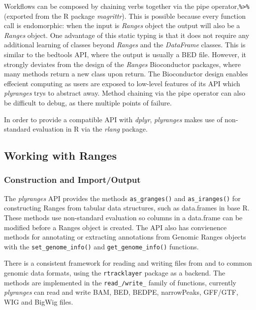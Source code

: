 \documentclass[10pt,letterpaper]{article}
\begin{document}
Workflows can be composed by chaining verbs together via the pipe
operator,\texttt{\%\textgreater{}\%} (exported from the R package
\emph{magrittr}). This is possible because every function call is
endomorphic: when the input is \emph{Ranges} object the output will also
be a \emph{Ranges} object. One advantage of this static typing is that
it does not require any additional learning of classes beyond
\emph{Ranges} and the \emph{DataFrame} classes. This is similar to the
bedtools API, where the output is usually a BED file. However, it
strongly deviates from the design of the \emph{Ranges} Bioconductor
packages, where many methods return a new class upon return. The
Bioconductor design enables effecient computing as users are exposed to
low-level features of its API which \emph{plyranges} trys to abstract
away. Method chaining via the pipe operator can also be difficult to
debug, as there multiple points of failure.

In order to provide a compatible API with \emph{dplyr}, \emph{plyranges}
makes use of non-standard evaluation in R via the \emph{rlang} package.

\hypertarget{working-with-ranges}{%
\subsection{Working with Ranges}\label{working-with-ranges}}

\hypertarget{construction-and-importoutput}{%
\subsubsection{Construction and
Import/Output}\label{construction-and-importoutput}}

The \emph{plyranges} API provides the methods \texttt{as\_granges()} and
\texttt{as\_iranges()} for constructing Ranges from tabular data
structures, such as data.frames in base R. These methods use
non-standard evaluation so columns in a data.frame can be modified
before a Ranges object is created. The API also has convienence methods
for annotating or extracting annotations from Genomic Ranges objects
with the \texttt{set\_genome\_info()} and \texttt{get\_genome\_info()}
functions.

There is a consistent framework for reading and writing files from and
to common genomic data formats, using the \texttt{rtracklayer} package
as a backend. The methods are implemented in the \texttt{read\_/write\_}
family of functions, currently \emph{plyranges} can read and write BAM,
BED, BEDPE, narrowPeaks, GFF/GTF, WIG and BigWig files.
\end{document}
